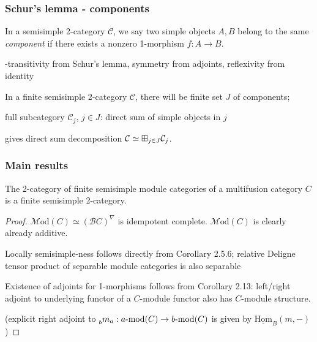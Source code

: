 \documentclass{beamer}
\newcommand{\cB}{{\mathcal{B}}}
\newcommand{\cC}{{\mathcal{C}}}
\newcommand{\bigboxplus}{\Huge \boxplus}
\newcommand{\amod}[1]{{#1\textrm{-mod}}}
\newcommand{\Mod}{{\mathcal{M}\textrm{od}}}
\newcommand{\ModA}[1]{{\Mod(#1)}}
\newcommand{\ihom}{{\underline{\textrm{Hom}}}}
\begin{document}
\begin{frame}
\frametitle{Schur's lemma - components}


\begin{definition}
In a semisimple 2-category $\cC$,
we say two simple objects $A,B$ belong to the same
\emph{component} if there exists a nonzero 1-morphism
$f: A \to B$.
\end{definition}

\pause

-transitivity from Schur's lemma, symmetry from adjoints,
reflexivity from identity

\pause

In a finite semisimple 2-category $\cC$,
there will be finite set $J$ of components;

\pause

full subcategory $\cC_j$, $j \in J$:
direct sum of simple objects in $j$

\pause

gives direct sum decomposition
$\cC \simeq \bigboxplus_{j \in J} \cC_j$.

\end{frame}

\begin{frame}
\frametitle{Main results}

\begin{theorem}
The 2-category of finite semisimple module categories
of a multifusion category $C$
is a finite semisimple 2-category.
\end{theorem}

\pause

\begin{proof}
$\ModA{C} \simeq (\cB C)^\nabla$ is idempotent complete.
$\ModA{C}$ is clearly already additive.


Locally semisimple-ness follows directly from
\cite{DSPSb}{Corollary 2.5.6};
\pause
relative Deligne tensor product of separable module categories
is also separable

\pause

Existence of adjoints for 1-morphisms
follows from \cite{DSPSa}{Corollary 2.13}:
left/right adjoint to underlying functor
of a $C$-module functor
also has $C$-module structure.

\pause
(explicit right adjoint to
$\prescript{}{b}m_a : \amod{a}(C) \to \amod{b}(C)$
is given by $\ihom_B(m,-)$)

\end{proof}

\end{frame}
\end{document}
